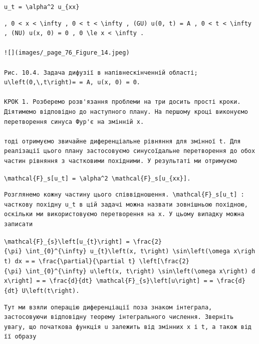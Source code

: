 \documentclass[
  ukrainian,
]{article}
\begin{document}
\texttt{u\_t\ =\ \textbackslash{}alpha\^{}2\ u\_\{xx\}}

\begin{verbatim}
, 0 < x < \infty , 0 < t < \infty , (GU) u(0, t) = A , 0 < t < \infty , (NU) u(x, 0) = 0 , 0 \le x < \infty .

![](images/_page_76_Figure_14.jpeg)

Рис. 10.4. Задача дифузії в напівнескінченній області; u\left(0,\,t\right)= = A, u(x, 0) = 0.

КРОК 1. Розберемо розв'язання проблеми на три досить прості кроки. Діятимемо відповідно до наступного плану. На першому кроці виконуємо перетворення синуса Фур'є на змінній x.

тоді отримуємо звичайне диференціальне рівняння для змінної t. Для реалізації цього плану застосовуємо синусоїдальне перетворення до обох частин рівняння з частковими похідними. У результаті ми отримуємо
\end{verbatim}

\texttt{\textbackslash{}mathcal\{F\}\_s{[}u\_t{]}\ =\ \textbackslash{}alpha\^{}2\ \textbackslash{}mathcal\{F\}\_s{[}u\_\{xx\}{]}.}

\begin{verbatim}
Розглянемо кожну частину цього співвідношення. \mathcal{F}_s[u_t] : часткову похідну u_t в цій задачі можна назвати зовнішньою похідною, оскільки ми використовуємо перетворення на x. У цьому випадку можна записати
\end{verbatim}

\texttt{\textbackslash{}mathcal\{F\}\_\{s\}\textbackslash{}left{[}u\_\{t\}\textbackslash{}right{]}\ =\ \textbackslash{}frac\{2\}\{\textbackslash{}pi\}\ \textbackslash{}int\_\{0\}\^{}\{\textbackslash{}infty\}\ u\_\{t\}\textbackslash{}left(x,\ t\textbackslash{}right)\ \textbackslash{}sin\textbackslash{}left(\textbackslash{}omega\ x\textbackslash{}right)\ dx\ =}
\texttt{=\ \textbackslash{}frac\{\textbackslash{}partial\}\{\textbackslash{}partial\ t\}\ \textbackslash{}left{[}\textbackslash{}frac\{2\}\{\textbackslash{}pi\}\ \textbackslash{}int\_\{0\}\^{}\{\textbackslash{}infty\}\ u\textbackslash{}left(x,\ t\textbackslash{}right)\ \textbackslash{}sin\textbackslash{}left(\textbackslash{}omega\ x\textbackslash{}right)\ dx\textbackslash{}right{]}\ =}
\texttt{=\ \textbackslash{}frac\{d\}\{dt\}\ \textbackslash{}mathcal\{F\}\_\{s\}\textbackslash{}left{[}u\textbackslash{}right{]}\ =}
\texttt{=\ \textbackslash{}frac\{d\}\{dt\}\ U\textbackslash{}left(t\textbackslash{}right).}

\begin{verbatim}
Тут ми взяли операцію диференціації поза знаком інтеграла, застосовуючи відповідну теорему інтегрального числення. Зверніть увагу, що початкова функція u залежить від змінних x і t, а також від її образу
\end{verbatim}
\end{document}
